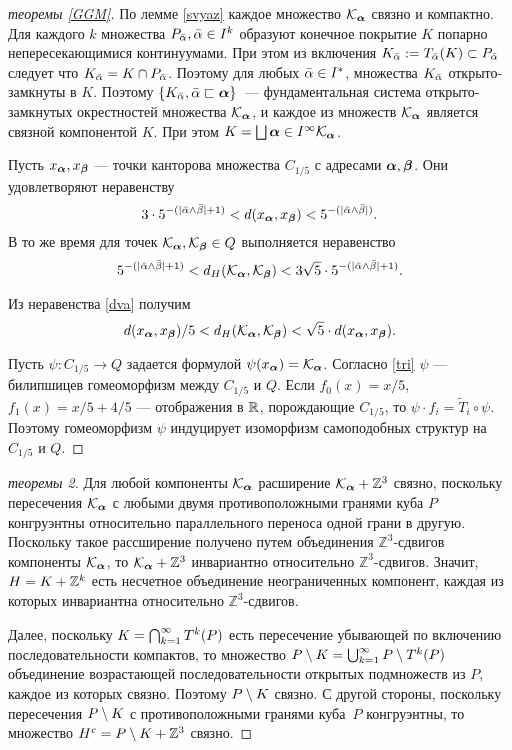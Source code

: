 \begin{proof}[теоремы \ref{GGM}]
По лемме \ref{svyaz} каждое множество ${\mathcal K}_{\bm{\alpha}}$ связно и компактно. 
Для каждого $k$ множества $P_{\bar{\alpha}}, \bar{\alpha}\in I^k$ образуют конечное покрытие $K$ попарно непересекающимися континуумами. 
При этом из включения $K_{\bar{\alpha}}:=T_{\bar{\alpha}}(K)\subset P_{\bar{\alpha}}$ следует что $K_{\bar{\alpha}}= K\cap P_{\bar{\alpha}}$. 
Поэтому для любых ${\bar{\alpha}}\in I^*$, множества $K_{\bar{\alpha}}$ открыто-замкнуты в $K$. 
Поэтому  $\{K_{\bar{\alpha}},{\bar{\alpha}}\sqsubset{\bm{\alpha}}\}$~--- фундаментальная система открыто-замкнутых окрестностей множества ${\mathcal K}_{\bm{\alpha}}$, и каждое из множеств ${\mathcal K}_{\bm{\alpha}}$ является связной компонентой $K$. 
При этом $K=\bigsqcup\limits{{\bm{\alpha}}\in I^\infty}{\mathcal K}_{\bm{\alpha}}$.

Пусть $x_{\bm{\alpha}}, x_{\bm{\beta}}$ --- точки канторова множества $C_{1/5}$ с адресами ${\bm{\alpha}}, {\bm{\beta}}$. 
Они удовлетворяют неравенству
$$3\cdot5^{-(|\bar{\alpha}\wedge\bar{\beta}|+1)} < d(x_{\bm{\alpha}}, x_{\bm{\beta}}) < 5^{-(|\bar{\alpha}\wedge\bar{\beta}|)}.$$
В то же время для точек ${\mathcal K}_{{\bm{\alpha}}},{\mathcal K}_{{\bm{\beta}}}\in Q$ выполняется неравенство
\begin{equation}\label{dva} 
5^{-(|\bar{\alpha}\wedge\bar{\beta}|+1)} < d_H({\mathcal K}_{{\bm{\alpha}}},{\mathcal K}_{{\bm{\beta}}}) < 3\sqrt5\cdot 5^{-(|\bar{\alpha}\wedge\bar{\beta}|+1)}.
\end{equation}

Из неравенства \eqref{dva} получим
\begin{equation}\label{tri} 
d(x_{\bm{\alpha}}, x_{\bm{\beta}})/5<d_H({\mathcal K}_{{\bm{\alpha}}},{\mathcal K}_{{\bm{\beta}}})< \sqrt5\cdot d(x_{\bm{\alpha}}, x_{\bm{\beta}}).
\end{equation}

Пусть $\psi:C_{1/5}\to Q$  задается формулой $\psi(x_{\bm{\alpha}})={\mathcal K}_{\bm{\alpha}}$. Согласно \eqref{tri}  $\psi$  --- билипшицев гомеоморфизм между $C_{1/5}$ и $Q$. 
Если $f_0(x)=x/5$, $f_1(x)=x/5+4/5$  --- отображения в $\mathbb{R}$, порождающие $C_{1/5}$, то $\psi\cdot f_i=\tilde T_i\circ\psi$. 
Поэтому гомеоморфизм $\psi$ индуцирует изоморфизм самоподобных структур на $C_{1/5}$ и $Q$. 
\end{proof}

\begin{proof}[теоремы 2]
Для любой компоненты ${\mathcal K}_{\bm{\alpha}}$ расширение ${\mathcal K}_{\bm{\alpha}}+\mathbb{Z}^3$ связно, поскольку  пересечения ${\mathcal K}_{\bm{\alpha}}$ с любыми двумя противоположными гранями куба $P$ конгруэнтны относительно параллельного переноса одной грани в другую.
Поскольку такое рассширение получено путем объединения $\mathbb{Z}^3$-сдвигов компоненты ${\mathcal K}_{\bm{\alpha}}$, то ${\mathcal K}_{\bm{\alpha}}+\mathbb{Z}^3$ инвариантно относительно $\mathbb{Z}^3$-сдвигов. 
Значит, $H=K+\mathbb{Z}^k$ есть несчетное объединение неограниченных компонент, каждая из которых инвариантна относительно $\mathbb{Z}^3$-сдвигов.

Далее, поскольку $K=\bigcap_{k=1}^\infty T^k(P)$ есть пересечение убывающей по включению последовательности компактов, то множество $P\setminus K=\bigcup_{k=1}^\infty P\setminus T^k(P)$ объединение возрастающей последовательности открытых подмножеств из $P$, каждое из которых связно. 
Поэтому $P\setminus K$ связно. С другой стороны, поскольку пересечения $P\setminus K$ с противоположными гранями куба~$P$ конгруэнтны, то множество $H^c=P\setminus K +\mathbb{Z}^3$ связно. 
\end{proof}



